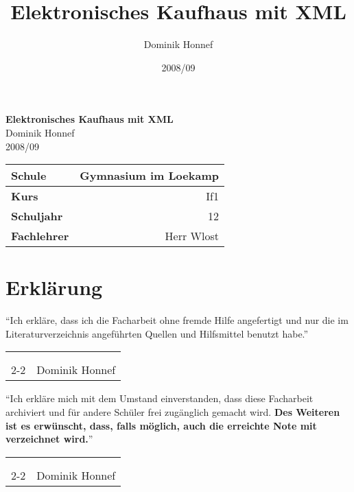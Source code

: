 \documentclass[12pt,oneside,ngerman,a4paper,bibgerm]{scrreprt}
\author{Dominik Honnef}
\title{Elektronisches Kaufhaus mit XML}
\date{2008/09}
\makeatletter
\newcommand{\signature}[1]{
  \vspace*{\bigskipamount}
  \hfill
  \begin{tabularx}{0.95\linewidth}{Xr}
    \\
    \\
    \\
    \cline{2-2}
    & \makebox[4cm][r]#1
  \end{tabularx}
  \vspace*{\bigskipamount}
}
\renewcommand*{\lstlistoflistings}{%
  \begingroup
    \if@twocolumn
      \@restonecoltrue\onecolumn
    \else
      \@restonecolfalse
    \fi
    \lol@heading
    \setlength{\parskip}{\z@}%
    \setlength{\parindent}{\z@}%
    \setlength{\parfillskip}{\z@ \@plus 1fil}%
    \@starttoc{lol}%
    \if@restonecol\twocolumn\fi
  \endgroup
}
\renewcommand*{\chapterpagestyle}{scrheadings}
\makeatother
\begin{document}
\onehalfspacing
\clearpage
\begingroup
{}
\renewcommand*{\chapterpagestyle}{empty}
\pagestyle{empty}
\vspace*{\fill}
\begin{center}
  \textbf{\huge{Elektronisches Kaufhaus mit XML}} \\
  \bigskip
  \small{Dominik Honnef} \\
  \bigskip
  \small{2008/09}
\end{center}
\vspace*{\fill}
\begin{tabular}{|l|r|}
  \hline
  \textbf{Schule} & Gymnasium im Loekamp \\
  \hline
  \textbf{Kurs} & If1 \\
  \hline
  \textbf{Schuljahr} & 12 \\
  \hline
  \textbf{Fachlehrer} & Herr Wlost \\
  \hline
\end{tabular}
\clearpage
\tableofcontents{}
\clearpage
\endgroup
\newpage






\nocite{pdf:xslt}
\nocite{pdf:xquery}
\nocite{pdf:xml}
\nocite{pdf:xslfo}
\nocite{wiki:de:xml}
\nocite{book:phpmysql}

\chapter*{Erklärung}
"`Ich erkläre, dass ich die Facharbeit ohne fremde
Hilfe angefertigt und nur die
im Literaturverzeichnis angeführten Quellen und Hilfsmittel benutzt habe."' \\
\signature{Dominik Honnef}

"`Ich erkläre mich mit dem Umstand einverstanden, dass diese
Facharbeit archiviert und für andere Schüler frei zugänglich gemacht
wird. \textbf{Des Weiteren ist es erwünscht, dass, falls möglich, auch die
erreichte Note mit verzeichnet wird.}"' \\
\signature{Dominik Honnef}
\end{document}
